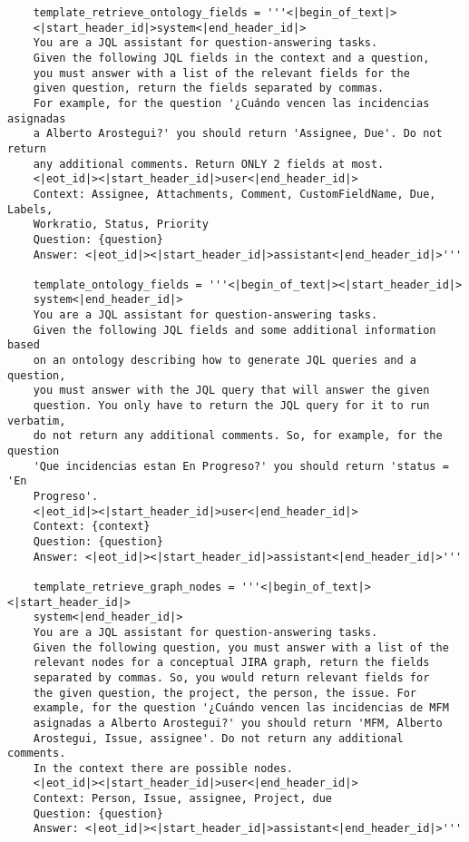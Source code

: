 \begin{small}
\begin{verbatim}
    template_retrieve_ontology_fields = '''<|begin_of_text|>
    <|start_header_id|>system<|end_header_id|>
    You are a JQL assistant for question-answering tasks.
    Given the following JQL fields in the context and a question, 
    you must answer with a list of the relevant fields for the 
    given question, return the fields separated by commas. 
    For example, for the question '¿Cuándo vencen las incidencias asignadas 
    a Alberto Arostegui?' you should return 'Assignee, Due'. Do not return 
    any additional comments. Return ONLY 2 fields at most.
    <|eot_id|><|start_header_id|>user<|end_header_id|>
    Context: Assignee, Attachments, Comment, CustomFieldName, Due, Labels, 
    Workratio, Status, Priority 
    Question: {question}
    Answer: <|eot_id|><|start_header_id|>assistant<|end_header_id|>'''

    template_ontology_fields = '''<|begin_of_text|><|start_header_id|>
    system<|end_header_id|> 
    You are a JQL assistant for question-answering tasks.
    Given the following JQL fields and some additional information based 
    on an ontology describing how to generate JQL queries and a question, 
    you must answer with the JQL query that will answer the given 
    question. You only have to return the JQL query for it to run verbatim,
    do not return any additional comments. So, for example, for the question 
    'Que incidencias estan En Progreso?' you should return 'status = 'En 
    Progreso'.
    <|eot_id|><|start_header_id|>user<|end_header_id|>
    Context: {context} 
    Question: {question}
    Answer: <|eot_id|><|start_header_id|>assistant<|end_header_id|>'''

    template_retrieve_graph_nodes = '''<|begin_of_text|><|start_header_id|>
    system<|end_header_id|> 
    You are a JQL assistant for question-answering tasks.
    Given the following question, you must answer with a list of the 
    relevant nodes for a conceptual JIRA graph, return the fields 
    separated by commas. So, you would return relevant fields for 
    the given question, the project, the person, the issue. For 
    example, for the question '¿Cuándo vencen las incidencias de MFM 
    asignadas a Alberto Arostegui?' you should return 'MFM, Alberto 
    Arostegui, Issue, assignee'. Do not return any additional comments. 
    In the context there are possible nodes.
    <|eot_id|><|start_header_id|>user<|end_header_id|>
    Context: Person, Issue, assignee, Project, due
    Question: {question}
    Answer: <|eot_id|><|start_header_id|>assistant<|end_header_id|>'''


\end{verbatim}
\end{small}
